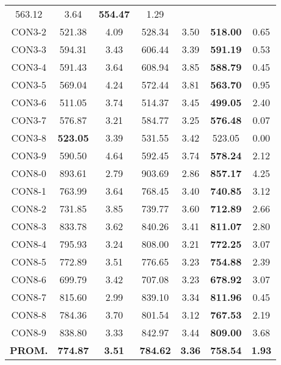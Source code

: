 \begin{table}[ht]
\begin{tabular}{c c c c c c c}
563.12 & 3.64 & \bf{554.47} & 
1.29\\CON3-2 & 521.38 & 4.09 & 
528.34 & 3.50 & \bf{518.00} & 
0.65\\CON3-3 & 594.31 & 3.43 & 
606.44 & 3.39 & \bf{591.19} & 
0.53\\CON3-4 & 591.43 & 3.64 & 
608.94 & 3.85 & \bf{588.79} & 
0.45\\CON3-5 & 569.04 & 4.24 & 
572.44 & 3.81 & \bf{563.70} & 
0.95\\CON3-6 & 511.05 & 3.74 & 
514.37 & 3.45 & \bf{499.05} & 
2.40\\CON3-7 & 576.87 & 3.21 & 
584.77 & 3.25 & \bf{576.48} & 
0.07\\CON3-8 & \bf{523.05} & 3.39 & 
531.55 & 3.42 & 523.05 & 0.00\\
CON3-9 & 590.50 & 4.64 & 
592.45 & 3.74 & \bf{578.24} & 
2.12\\CON8-0 & 893.61 & 2.79 & 
903.69 & 2.86 & \bf{857.17} & 
4.25\\CON8-1 & 763.99 & 3.64 & 
768.45 & 3.40 & \bf{740.85} & 
3.12\\CON8-2 & 731.85 & 3.85 & 
739.77 & 3.60 & \bf{712.89} & 
2.66\\CON8-3 & 833.78 & 3.62 & 
840.26 & 3.41 & \bf{811.07} & 
2.80\\CON8-4 & 795.93 & 3.24 & 
808.00 & 3.21 & \bf{772.25} & 
3.07\\CON8-5 & 772.89 & 3.51 & 
776.65 & 3.23 & \bf{754.88} & 
2.39\\CON8-6 & 699.79 & 3.42 & 
707.08 & 3.23 & \bf{678.92} & 
3.07\\CON8-7 & 815.60 & 2.99 & 
839.10 & 3.34 & \bf{811.96} & 
0.45\\CON8-8 & 784.36 & 3.70 & 
801.54 & 3.12 & \bf{767.53} & 
2.19\\CON8-9 & 838.80 & 3.33 & 
842.97 & 3.44 & \bf{809.00} & 
3.68\\\bf{PROM.} & 
\bf{774.87} & \bf{3.51} & \bf{784.62} & \bf{3.36} & \bf{758.54} & \bf{1.93}\\[1ex]\hline
\end{tabular}
\label{table:nonlin}
\end{table} \clearpage
